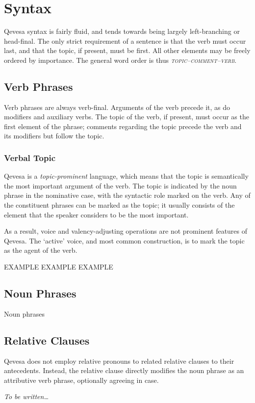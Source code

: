 \documentclass[grammar]{subfiles}
\begin{document}
	\chapter{Syntax}
	\label{ch:syntax}

	Qevesa syntax is fairly fluid, and tends towards being largely left-branching or head-final.  The only strict requirement of a sentence is that the verb must occur last, and that the topic, if present, must be first.  All other elements may be freely ordered by importance.  The general word order is thus \emph{\textsc{topic–comment–verb}}.

	\section{Verb Phrases}
	\label{sec:syn_verb_phrases}

	Verb phrases are always verb-final.  Arguments of the verb precede it, as do modifiers and auxiliary verbs.  The topic of the verb, if present, must occur as the first element of the phrase; comments regarding the topic precede the verb and its modifiers but follow the topic.

	\subsection{Verbal Topic}
	\label{ssec:syn_verbal_topic}

	Qevesa is a \emph{topic-prominent} language, which means that the topic is semantically the most important argument of the verb.  The topic is indicated by the noun phrase in the nominative case, with the syntactic role marked on the verb.  Any of the constituent phrases can be marked as the topic; it usually consists of the element that the speaker considers to be the most important.

	As a result, voice and valency-adjusting operations are not prominent features of Qevesa.  The ‘active’ voice, and most common construction, is to mark the topic as the agent of the verb.

	\begin{exe}
		\ex
		\begin{xlist}
			\ex EXAMPLE
			\ex EXAMPLE
			\ex EXAMPLE
		\end{xlist}
	\end{exe}

	\section{Noun Phrases}
	\label{sec:syn_noun_phrases}

	Noun phrases 

	\section{Relative Clauses}
	\label{sec:syn_relative_clauses}

	Qevesa does not employ relative pronouns to related relative clauses to their antecedents.  Instead, the relative clause directly modifies the noun phrase as an attributive verb phrase, optionally agreeing in case.

	\emph{To be written…}
\end{document}

